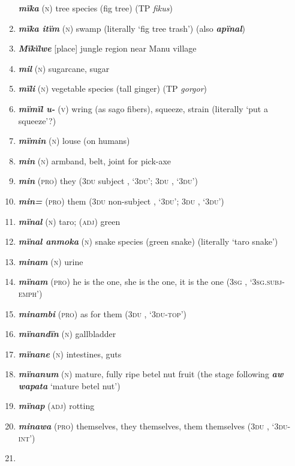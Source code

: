 \begin{enumerate}[noitemsep, label={}, align=left, widest=190, labelsep=1ex,leftmargin=*,itemindent=-10pt]
\textbf{\textit{mïka}} (\textsc{n}) tree species (fig tree) (TP \textit{fikus}) \item 
\textbf{\textit{mïka itïm}} (\textsc{n}) swamp (literally ‘fig tree trash’) (also \textbf{\textit{apïnal}}) \item 
\textbf{\textit{Mïkïlwe}} [place] jungle region near Manu village \item 
\textbf{\textit{mil}} (\textsc{n}) sugarcane, sugar \item 
\textbf{\textit{mïli}} (\textsc{n}) vegetable species (tall ginger) (TP \textit{gorgor}) \item 
\textbf{\textit{mïmïl u-}} (\textsc{v}) wring (as sago fibers), squeeze, strain (literally ‘put a squeeze’?) \item 
\textbf{\textit{mïmin}} (\textsc{n}) louse (on humans) \item 
\textbf{\textit{min}} (\textsc{n}) armband, belt, joint for pick-axe \item 
\textbf{\textit{min}} (\textsc{pro}) they (3\textsc{du} subject , ‘\textsc{3du}’; 3\textsc{du} , ‘\textsc{3du}’) \item 
\textbf{\textit{min=}} (\textsc{pro}) them (3\textsc{du} non-subject , ‘\textsc{3du}’; 3\textsc{du} , ‘\textsc{3du}’) \item 
\textbf{\textit{mïnal}} (\textsc{n}) taro; (\textsc{adj}) green \item 
\textbf{\textit{mïnal anmoka}} (\textsc{n}) snake species (green snake) (literally ‘taro snake’) \item 
\textbf{\textit{minam}} (\textsc{n}) urine \item 
\textbf{\textit{mïnam}} (\textsc{pro}) he is the one, she is the one, it is the one (3\textsc{sg} , ‘\textsc{3sg.subj-emph}’) \item 
\textbf{\textit{minambi}} (\textsc{pro}) as for them (3\textsc{du} , ‘\textsc{3du-top}’) \item 
\textbf{\textit{mïnandïn}} (\textsc{n}) gallbladder \item 
\textbf{\textit{mïnane}} (\textsc{n}) intestines, guts \item 
\textbf{\textit{mïnanum}} (\textsc{n}) mature, fully ripe betel nut fruit (the stage following \textbf{\textit{aw wapata}} ‘mature betel nut’) \item 
\textbf{\textit{mïnap}} (\textsc{adj}) rotting \item 
\textbf{\textit{minawa}} (\textsc{pro}) themselves, they themselves, them themselves (\textsc{3du} , ‘\textsc{3du-int}’) \item 

\end{enumerate}
